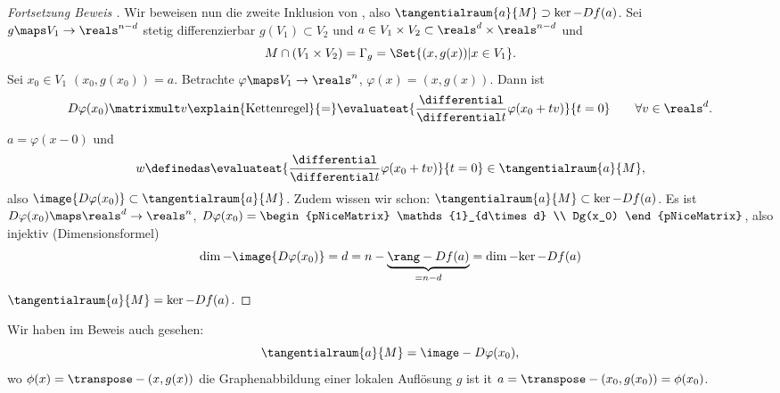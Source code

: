 \begin{proof}[Fortsetzung Beweis ]
  Wir beweisen nun die zweite Inklusion von , also \( \tangentialraum{a}{M}\supset \ker-{Df(a)} \). Sei \( g\maps V_1\to \reals^{n-d} \) stetig differenzierbar \sd \( g(V_1)\subset V_2 \) und \( a\in V_1\times V_2\subset \reals^d \times \reals^{n-d} \) und
\begin{equation*}
  M\cap (V_1\times V_2)=\Gamma_g=\Set{(x,g(x))|x\in V_1}.
\end{equation*}
Sei \( x_0\in V_1  \) \sd \( (x_0,g(x_0))=a \). Betrachte \( \varphi\maps V_1\to \reals^n \), \( \varphi(x)=(x,g(x)) \). Dann ist
\begin{equation*}
  D\varphi(x_0)\matrixmult v\explain{\text{Kettenregel}}{=}\evaluateat{\frac{\differential}{\differential t} \varphi(x_0+tv)}{t=0}\qquad \forall v\in \reals^d.
\end{equation*}
\timplies \( a=\varphi(x-0) \) und 
\begin{equation*}
  w\definedas \evaluateat{\frac{\differential}{\differential t} \varphi(x_0+tv)}{t=0}\in \tangentialraum{a}{M},
\end{equation*}
also \( \image{D\varphi(x_0)}\subset \tangentialraum{a}{M} \). Zudem wissen wir schon: \( \tangentialraum{a}{M}\subset \ker-{Df(a)} \). Es ist \( D\varphi(x_0)\maps \reals^d\to \reals^n \), \( D\varphi(x_0)=\begin{pNiceMatrix} \mathds{1}_{d\times d} \\ Dg(x_0) \end{pNiceMatrix} \), also injektiv \timplies (Dimensionsformel)
\begin{equation*}
  \dim-{\image{D\varphi(x_0)}}=d=n-\underbrace{\rang-{Df(a)}}_{=n-d}=\dim-{\ker-{Df(a)}}
\end{equation*}
\timplies \( \tangentialraum{a}{M}=\ker-{Df(a)} \).
\end{proof}
Wir haben im Beweis auch gesehen:
\begin{equation*}
  \tangentialraum{a}{M}=\image-{D\varphi(x_0)},
\end{equation*}
wo \( \phi(x)=\transpose-{(x,g(x))} \) die Graphenabbildung einer lokalen Auflösung \( g \) ist it \( a=\transpose-{(x_0,g(x_0))}=\phi(x_0) \).

